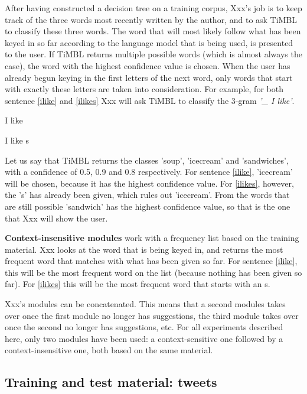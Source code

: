 \documentclass[11pt]{article}
\begin{document}
After having constructed a decision tree on a training corpus, Xxx's job is to keep track of the three words most recently written by the author, and to ask TiMBL to classify these three words. The word that will most likely follow what has been keyed in so far according to the language model that is being used, is presented to the user. If TiMBL returns multiple possible words (which is almost always the case), the word with the highest confidence value is chosen. When the user has already begun keying in the first letters of the next word, only words that start with exactly these letters are taken into consideration. For example, for both sentence \ref{ilike} and \ref{ilikes} Xxx will ask TiMBL to classify the 3-gram \emph{'\_ I like'}.

\begin{examples}
\item I like \label{ilike}
\item I like s \label{ilikes}
\end{examples}

Let us say that TiMBL returns the classes 'soup', 'icecream' and 'sandwiches', with a confidence of 0.5, 0.9 and 0.8 respectively. For sentence \ref{ilike}, 'icecream' will be chosen, because it has the highest confidence value. For \ref{ilikes}, however, the 's' has already been given, which rules out 'icecream'. From the words that are still possible 'sandwich' has the highest confidence value, so that is the one that Xxx will show the user.

\textbf{Context-insensitive modules} work with a frequency list based on the training material. Xxx looks at the word that is being keyed in, and returns the most frequent word that matches with what has been given so far. For sentence \ref{ilike}, this will be the most frequent word on the list (because nothing has been given so far). For \ref{ilikes} this will be the most frequent word that starts with an s.

Xxx's modules can be concatenated. This means that a second modules takes over once the first module no longer has suggestions, the third module takes over once the second no longer has suggestions, etc. For all experiments described here, only two modules have been used: a context-sensitive one followed by a context-insensitive one, both based on the same material.

\subsection{Training and test material: tweets}
\end{document}
